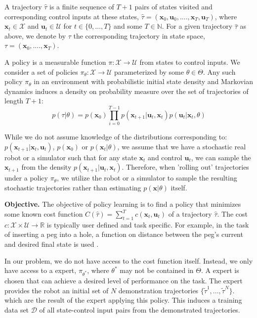 \documentclass[10pt, conference]{ieeeconf}      %
\newcommand{\bu}{\mathbf{u}}
\newcommand{\bx}{\mathbf{x}}
\begin{document}

A trajectory $\hat{\tau}$ is a finite sequence of $T+1$ pairs of states visited and corresponding
control inputs at these states, $\hat{\tau} = (\mathbf{x}_0,\mathbf{u}_0, ...., \mathbf{x}_T,\mathbf{u}_T)$, where $\bx_t\in \mathcal{X}$
and $\bu_t\in \mathcal{U}$ for $t\in \{0, \ldots, T\}$ and some $T\in \mathbb{N}$.  
For a given trajectory $\hat{\tau}$ as above, we denote by ${\tau}$ the corresponding trajectory in state space,
${\tau} = (\bx_0,....,\bx_T)$.


A policy is a measurable function $\pi: \mathcal{X} \to \mathcal{U}$ from states to control inputs. 
We consider a set of policies $\pi_{\theta}:\mathcal{X}\to \mathcal{U}$ parameterized by some $\theta\in \Theta$. Any such policy $\pi_{\theta}$ in an environment with probabilistic initial state density and Markovian dynamics
induces a density on probability measure over the set of  trajectories of length $T+1$: $$p(\tau | \theta)=
p(\bx_0)\prod_{i=0}^{T-1}p(\bx_{t+1}|\bu_t,\bx_t)p(\bu_t|\bx_t,\theta)$$


While we do not assume knowledge of the distributions corresponding to: $p(\bx_{t+1}|\bx_t,\bu_t)$, $p(\bx_0)$ or $p(\bx_t|
\theta)$, we assume that we have a stochastic real robot or a simulator such that for any state
$\bx_t$ and control $\bu_t$, we can sample the $\bx_{t+1}$ from the density $p(\bx_{t+1}|\bu_t,\bx_t)$. 
Therefore, when 'rolling out' trajectories under a policy
$\pi_{\theta}$, we utilize the robot or a simulator to sample the resulting stochastic trajectories rather than
estimating $p(\bx|\theta)$ itself.


\noindent\textbf{Objective.} The objective of  policy learning is to find a policy that minimizes some known cost function $C(\hat{\tau}) = \sum^T_{t=1} c(\bx_t,\bu_t)$ of a trajectory $\hat{\tau}$. The cost $c:\mathcal{X}\times \mathcal{U}\to \mathbb{R}$ is typically user defined and task specific. 
For example, in the task of inserting a peg into a hole, a function on distance between the peg's current and desired final state is used \cite{levine2015end}.  


In our problem, we do not have access to the cost function itself. Instead, we only have access to 
a expert, $\pi_{\theta^*}$, where $\theta^*$ may not be contained in $\Theta$. A expert is chosen that can achieve a desired level of performance on the task. The expert provides the robot an initial set
of $N$   demonstration trajectories $\lbrace \tilde{\tau}^1,...,\tilde{\tau}^N \rbrace$. 
which are the result of the expert applying this policy. This induces a training data set $\mathcal{D}$ of all state-control input pairs from the demonstrated trajectories.
\end{document}
